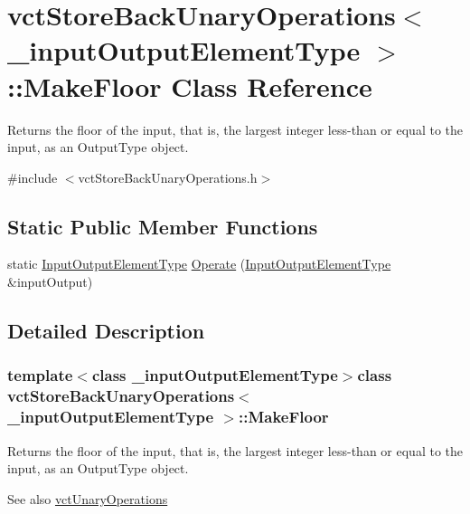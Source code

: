 \hypertarget{classvct_store_back_unary_operations_1_1_make_floor}{}\section{vct\+Store\+Back\+Unary\+Operations$<$ \+\_\+input\+Output\+Element\+Type $>$\+:\+:Make\+Floor Class Reference}
\label{classvct_store_back_unary_operations_1_1_make_floor}


Returns the floor of the input, that is, the largest integer less-\/than or equal to the input, as an Output\+Type object.  




{\ttfamily \#include $<$vct\+Store\+Back\+Unary\+Operations.\+h$>$}

\subsection*{Static Public Member Functions}
\begin{DoxyCompactItemize}
\item 
static \hyperlink{classvct_store_back_unary_operations_a8af17faaa73a8d090094d468eee32062}{Input\+Output\+Element\+Type} \hyperlink{classvct_store_back_unary_operations_1_1_make_floor_a8d544c65a3ed94a5707d953451d88dcc}{Operate} (\hyperlink{classvct_store_back_unary_operations_a8af17faaa73a8d090094d468eee32062}{Input\+Output\+Element\+Type} \&input\+Output)
\end{DoxyCompactItemize}


\subsection{Detailed Description}
\subsubsection*{template$<$class \+\_\+input\+Output\+Element\+Type$>$class vct\+Store\+Back\+Unary\+Operations$<$ \+\_\+input\+Output\+Element\+Type $>$\+::\+Make\+Floor}

Returns the floor of the input, that is, the largest integer less-\/than or equal to the input, as an Output\+Type object. 

\begin{DoxySeeAlso}{See also}
\hyperlink{classvct_unary_operations}{vct\+Unary\+Operations} 
\end{DoxySeeAlso}


